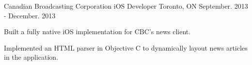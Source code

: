 \begin{cventries}
  \cventry
    {Canadian Broadcasting Corporation} %
    {iOS Developer} %
    {Toronto, ON} %
    {September. 2013 - December. 2013} %
    {
      \begin{cvitems} %
        \item {Built a fully native iOS implementation for CBC’s news client.}
        \item {Implemented an HTML parser in Objective C to dynamically layout news articles in the application.}
      \end{cvitems}
    }       


\end{cventries}
